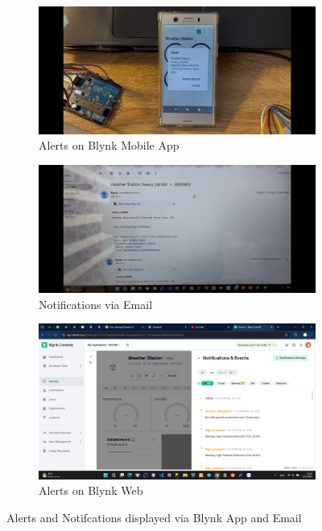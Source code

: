 \documentclass[conference, onecolumn]{IEEEtran}
\begin{document}
\begin{figure}[H]
    \centering
    \begin{subfigure}{0.45\textwidth}
        \centering
        \includegraphics[width=0.9\linewidth]{figures/z6411778617685_cbd16394e12ac6a735b409c7785fee52.jpg}
        \caption{Alerts on Blynk Mobile App} 
        \label{fig:mobile_app_alerts}
    \end{subfigure}
    \hfill
    \begin{subfigure}{0.45\textwidth}
        \centering
        \includegraphics[width=0.9\linewidth]{figures/z6411778633153_203678abd880ad2fa383207659a97fd6.jpg}
        \caption{Notifications via Email}
        \label{fig:email_notifications}
    \end{subfigure}
    \begin{subfigure}{0.45\textwidth}
        \centering
        \includegraphics[width=0.9\linewidth]{figures/Screenshot (207).png}
        \caption{Alerts on Blynk Web}
        \label{fig:web_alerts}
    \end{subfigure}
    \caption{Alerts and Notifcations displayed via Blynk App and Email}
    \label{fig:alerts_and_notifications}
\end{figure}
\end{document}
